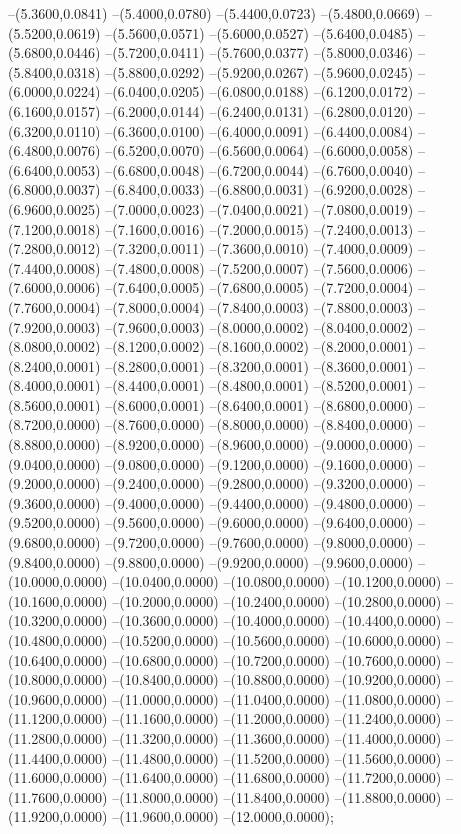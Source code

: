 {	--(5.3600,0.0841)
	--(5.4000,0.0780)
	--(5.4400,0.0723)
	--(5.4800,0.0669)
	--(5.5200,0.0619)
	--(5.5600,0.0571)
	--(5.6000,0.0527)
	--(5.6400,0.0485)
	--(5.6800,0.0446)
	--(5.7200,0.0411)
	--(5.7600,0.0377)
	--(5.8000,0.0346)
	--(5.8400,0.0318)
	--(5.8800,0.0292)
	--(5.9200,0.0267)
	--(5.9600,0.0245)
	--(6.0000,0.0224)
	--(6.0400,0.0205)
	--(6.0800,0.0188)
	--(6.1200,0.0172)
	--(6.1600,0.0157)
	--(6.2000,0.0144)
	--(6.2400,0.0131)
	--(6.2800,0.0120)
	--(6.3200,0.0110)
	--(6.3600,0.0100)
	--(6.4000,0.0091)
	--(6.4400,0.0084)
	--(6.4800,0.0076)
	--(6.5200,0.0070)
	--(6.5600,0.0064)
	--(6.6000,0.0058)
	--(6.6400,0.0053)
	--(6.6800,0.0048)
	--(6.7200,0.0044)
	--(6.7600,0.0040)
	--(6.8000,0.0037)
	--(6.8400,0.0033)
	--(6.8800,0.0031)
	--(6.9200,0.0028)
	--(6.9600,0.0025)
	--(7.0000,0.0023)
	--(7.0400,0.0021)
	--(7.0800,0.0019)
	--(7.1200,0.0018)
	--(7.1600,0.0016)
	--(7.2000,0.0015)
	--(7.2400,0.0013)
	--(7.2800,0.0012)
	--(7.3200,0.0011)
	--(7.3600,0.0010)
	--(7.4000,0.0009)
	--(7.4400,0.0008)
	--(7.4800,0.0008)
	--(7.5200,0.0007)
	--(7.5600,0.0006)
	--(7.6000,0.0006)
	--(7.6400,0.0005)
	--(7.6800,0.0005)
	--(7.7200,0.0004)
	--(7.7600,0.0004)
	--(7.8000,0.0004)
	--(7.8400,0.0003)
	--(7.8800,0.0003)
	--(7.9200,0.0003)
	--(7.9600,0.0003)
	--(8.0000,0.0002)
	--(8.0400,0.0002)
	--(8.0800,0.0002)
	--(8.1200,0.0002)
	--(8.1600,0.0002)
	--(8.2000,0.0001)
	--(8.2400,0.0001)
	--(8.2800,0.0001)
	--(8.3200,0.0001)
	--(8.3600,0.0001)
	--(8.4000,0.0001)
	--(8.4400,0.0001)
	--(8.4800,0.0001)
	--(8.5200,0.0001)
	--(8.5600,0.0001)
	--(8.6000,0.0001)
	--(8.6400,0.0001)
	--(8.6800,0.0000)
	--(8.7200,0.0000)
	--(8.7600,0.0000)
	--(8.8000,0.0000)
	--(8.8400,0.0000)
	--(8.8800,0.0000)
	--(8.9200,0.0000)
	--(8.9600,0.0000)
	--(9.0000,0.0000)
	--(9.0400,0.0000)
	--(9.0800,0.0000)
	--(9.1200,0.0000)
	--(9.1600,0.0000)
	--(9.2000,0.0000)
	--(9.2400,0.0000)
	--(9.2800,0.0000)
	--(9.3200,0.0000)
	--(9.3600,0.0000)
	--(9.4000,0.0000)
	--(9.4400,0.0000)
	--(9.4800,0.0000)
	--(9.5200,0.0000)
	--(9.5600,0.0000)
	--(9.6000,0.0000)
	--(9.6400,0.0000)
	--(9.6800,0.0000)
	--(9.7200,0.0000)
	--(9.7600,0.0000)
	--(9.8000,0.0000)
	--(9.8400,0.0000)
	--(9.8800,0.0000)
	--(9.9200,0.0000)
	--(9.9600,0.0000)
	--(10.0000,0.0000)
	--(10.0400,0.0000)
	--(10.0800,0.0000)
	--(10.1200,0.0000)
	--(10.1600,0.0000)
	--(10.2000,0.0000)
	--(10.2400,0.0000)
	--(10.2800,0.0000)
	--(10.3200,0.0000)
	--(10.3600,0.0000)
	--(10.4000,0.0000)
	--(10.4400,0.0000)
	--(10.4800,0.0000)
	--(10.5200,0.0000)
	--(10.5600,0.0000)
	--(10.6000,0.0000)
	--(10.6400,0.0000)
	--(10.6800,0.0000)
	--(10.7200,0.0000)
	--(10.7600,0.0000)
	--(10.8000,0.0000)
	--(10.8400,0.0000)
	--(10.8800,0.0000)
	--(10.9200,0.0000)
	--(10.9600,0.0000)
	--(11.0000,0.0000)
	--(11.0400,0.0000)
	--(11.0800,0.0000)
	--(11.1200,0.0000)
	--(11.1600,0.0000)
	--(11.2000,0.0000)
	--(11.2400,0.0000)
	--(11.2800,0.0000)
	--(11.3200,0.0000)
	--(11.3600,0.0000)
	--(11.4000,0.0000)
	--(11.4400,0.0000)
	--(11.4800,0.0000)
	--(11.5200,0.0000)
	--(11.5600,0.0000)
	--(11.6000,0.0000)
	--(11.6400,0.0000)
	--(11.6800,0.0000)
	--(11.7200,0.0000)
	--(11.7600,0.0000)
	--(11.8000,0.0000)
	--(11.8400,0.0000)
	--(11.8800,0.0000)
	--(11.9200,0.0000)
	--(11.9600,0.0000)
	--(12.0000,0.0000);
}
